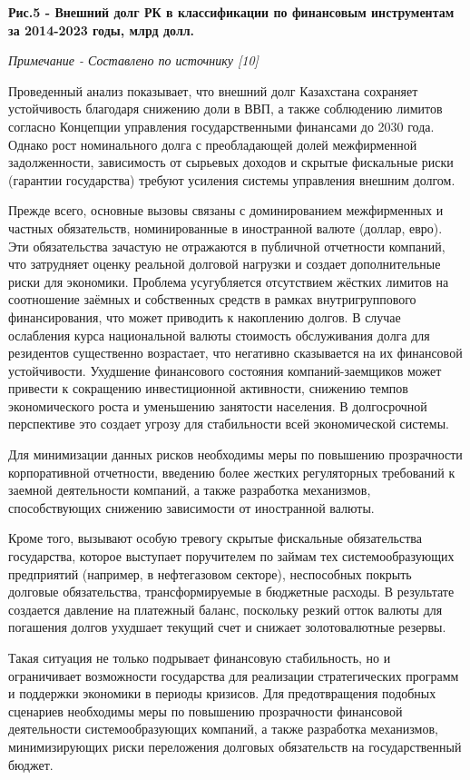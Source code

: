 {\bfseries Рис.5 - Внешний долг РК в классификации по финансовым инструментам за 2014-2023 годы, млрд долл.}

\emph{Примечание - Составлено по источнику {[}10{]}}

\begin{multicols}{2}
Проведенный анализ показывает, что внешний долг Казахстана сохраняет
устойчивость благодаря снижению доли в ВВП, а также соблюдению лимитов
согласно Концепции управления государственными финансами до 2030 года.
Однако рост номинального долга с преобладающей долей межфирменной
задолженности, зависимость от сырьевых доходов и скрытые фискальные
риски (гарантии государства) требуют усиления системы управления внешним
долгом.

Прежде всего, основные вызовы связаны с доминированием межфирменных и
частных обязательств, номинированные в иностранной валюте (доллар,
евро). Эти обязательства зачастую не отражаются в публичной отчетности
компаний, что затрудняет оценку реальной долговой нагрузки и создает
дополнительные риски для экономики. Проблема усугубляется отсутствием
жёстких лимитов на соотношение заёмных и собственных средств в рамках
внутригруппового финансирования, что может приводить к накоплению
долгов. В случае ослабления курса национальной валюты стоимость
обслуживания долга для резидентов существенно возрастает, что негативно
сказывается на их финансовой устойчивости. Ухудшение финансового
состояния компаний-заемщиков может привести к сокращению инвестиционной
активности, снижению темпов экономического роста и уменьшению занятости
населения. В долгосрочной перспективе это создает угрозу для
стабильности всей экономической системы.

Для минимизации данных рисков необходимы меры по повышению прозрачности
корпоративной отчетности, введению более жестких регуляторных требований
к заемной деятельности компаний, а также разработка механизмов,
способствующих снижению зависимости от иностранной валюты.

Кроме того, вызывают особую тревогу скрытые фискальные обязательства
государства, которое выступает поручителем по займам тех
системообразующих предприятий (например, в нефтегазовом секторе),
неспособных покрыть долговые обязательства, трансформируемые в бюджетные
расходы. В результате создается давление на платежный баланс, поскольку
резкий отток валюты для погашения долгов ухудшает текущий счет и снижает
золотовалютные резервы.

Такая ситуация не только подрывает финансовую стабильность, но и
ограничивает возможности государства для реализации стратегических
программ и поддержки экономики в периоды кризисов. Для предотвращения
подобных сценариев необходимы меры по повышению прозрачности финансовой
деятельности системообразующих компаний, а также разработка механизмов,
минимизирующих риски переложения долговых обязательств на
государственный бюджет.


\end{multicols}
